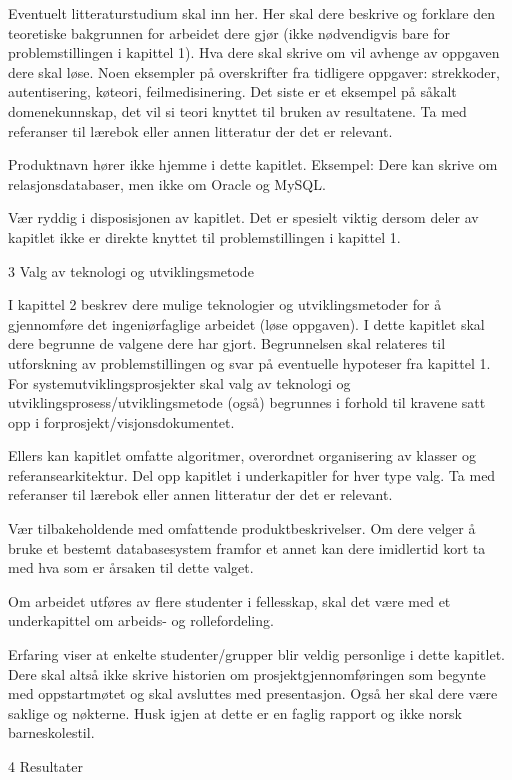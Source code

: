 Eventuelt litteraturstudium skal inn her. Her skal dere beskrive og forklare den teoretiske bakgrunnen for arbeidet dere gjør (ikke nødvendigvis bare for problemstillingen i kapittel 1).  Hva dere skal skrive om vil avhenge av oppgaven dere skal løse. Noen eksempler på overskrifter fra tidligere oppgaver: strekkoder, autentisering, køteori, feilmedisinering. Det siste er et eksempel på såkalt domenekunnskap, det vil si teori knyttet til bruken av resultatene. Ta med referanser til lærebok eller annen litteratur der det er relevant.

Produktnavn hører ikke hjemme i dette kapitlet. Eksempel: Dere kan skrive om relasjonsdatabaser, men ikke om Oracle og MySQL.

Vær ryddig i disposisjonen av kapitlet. Det er spesielt viktig dersom deler av kapitlet ikke er direkte knyttet til problemstillingen i kapittel 1.

3 Valg av teknologi og utviklingsmetode

I kapittel 2 beskrev dere mulige teknologier og utviklingsmetoder for å gjennomføre det ingeniørfaglige arbeidet (løse oppgaven). I dette kapitlet skal dere begrunne de valgene dere har gjort. Begrunnelsen skal relateres til utforskning av problemstillingen og svar på eventuelle hypoteser fra kapittel 1. For systemutviklingsprosjekter skal valg av teknologi og utviklingsprosess/utviklingsmetode (også) begrunnes i forhold til kravene satt opp i forprosjekt/visjonsdokumentet.

Ellers kan kapitlet omfatte algoritmer, overordnet organisering av klasser og referansearkitektur. Del opp kapitlet i underkapitler for hver type valg. Ta med referanser til lærebok eller annen litteratur der det er relevant.

Vær tilbakeholdende med omfattende produktbeskrivelser. Om dere velger å bruke et bestemt databasesystem framfor et annet kan dere imidlertid kort ta med hva som er årsaken til dette valget.

Om arbeidet utføres av flere studenter i fellesskap, skal det være med et underkapittel om arbeids- og rollefordeling.

Erfaring viser at enkelte studenter/grupper blir veldig personlige i dette kapitlet. Dere skal altså ikke skrive historien om prosjektgjennomføringen som begynte med oppstartmøtet og skal avsluttes med presentasjon. Også her skal dere være saklige og nøkterne. Husk igjen at dette er en faglig rapport og ikke norsk barneskolestil.

4 Resultater

